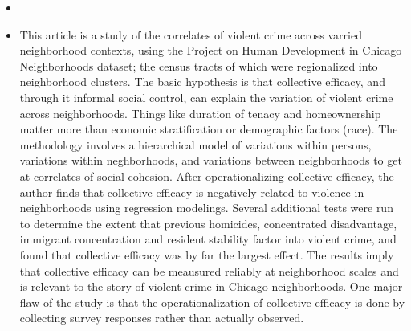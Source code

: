 \documentclass{article} \usepackage{filecontents}
\begin{document}
\begin{itemize}
\item \cite{sampson1997NeighborhoodsViolent}
\item This article is a study of the correlates of violent crime
  across varried neighborhood contexts, using the Project on Human
  Development in Chicago Neighborhoods dataset; the census tracts of
  which were regionalized into neighborhood clusters. The basic
  hypothesis is that collective efficacy, and through it informal
  social control, can explain the variation of violent crime across
  neighborhoods. Things like duration of tenacy and homeownership
  matter more than economic stratification or demographic factors
  (race). The methodology involves a hierarchical model of variations
  within persons, variations within neghborhoods, and variations
  between neighborhoods to get at correlates of social cohesion. After
  operationalizing collective efficacy, the author finds that
  collective efficacy is negatively related to violence in
  neighborhoods using regression modelings. Several additional tests
  were run to determine the extent that previous homicides,
  concentrated disadvantage, immigrant concentration and resident
  stability factor into violent crime, and found that collective
  efficacy was by far the largest effect. The results imply that
  collective efficacy can be meausured reliably at neighborhood scales
  and is relevant to the story of violent crime in Chicago
  neighborhoods. One major flaw of the study is that the
  operationalization of collective efficacy is done by collecting
  survey responses rather than actually observed.

\end{itemize}  
\end{document}
